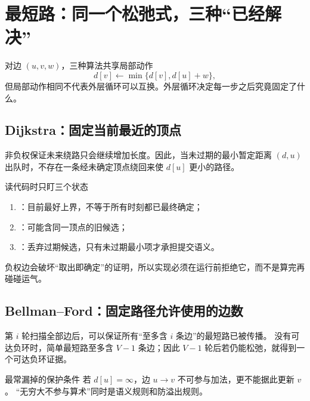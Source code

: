 \documentclass[UTF8,fontset=none,11pt,a4paper]{ctexart}
\begin{document}
\section{最短路：同一个松弛式，三种“已经解决”}

对边 $(u,v,w)$，三种算法共享局部动作
\[
d[v]\leftarrow\min\{d[v],d[u]+w\},
\]
但局部动作相同不代表外层循环可以互换。外层循环决定每一步之后究竟固定了什么。

\subsection{Dijkstra：固定当前最近的顶点}
非负权保证未来绕路只会继续增加长度。因此，当未过期的最小暂定距离 $(d,u)$ 出队时，不存在一条经未确定顶点绕回来使 $d[u]$ 更小的路径。

\begin{methodbox}{读代码时只盯三个状态}
\begin{enumerate}
  \item {}：目前最好上界，不等于所有时刻都已最终确定；
  \item {}：可能含同一顶点的旧候选；
  \item {}：丢弃过期候选，只有未过期最小项才承担提交语义。
\end{enumerate}
负权边会破坏“取出即确定”的证明，所以实现必须在运行前拒绝它，而不是算完再碰碰运气。
\end{methodbox}



\subsection{Bellman--Ford：固定路径允许使用的边数}
第 $i$ 轮扫描全部边后，可以保证所有“至多含 $i$ 条边”的最短路已被传播。
没有可达负环时，简单最短路至多含 $V-1$ 条边；因此 $V-1$ 轮后若仍能松弛，就得到一个可达负环证据。

\begin{corebox}{最常漏掉的保护条件}
若 $d[u]=\infty$，边 $u\to v$ 不可参与加法，更不能据此更新 $v$。
“无穷大不参与算术”同时是语义规则和防溢出规则。
\end{corebox}


\end{document}
